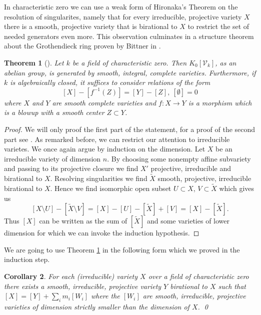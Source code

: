 \documentclass[11pt, a4paper, german]{article}
\theoremstyle{plain}
\newtheorem{theorem}{Theorem}[section]
\newtheorem{corollary}[theorem]{Corollary}
\theoremstyle{definition}
\newcommand{\gring}[1][k]{K_0[\mathcal{V}_#1]}
\begin{document}
In characteristic zero we can use a weak form of Hironaka's Theorem on the resolution of singularites, namely that for every irreducible, 
projective variety $X$ there is a smooth, projective variety that is birational to $X$ to restrict the set of needed generators even more. 
This observation culminates in a structure theorem about the Grothendieck ring proven by Bittner in \cite{Bittner}.


\begin{theorem}[{\cite[Thm. 3.1]{Bittner}}]
    \label{bittner}
    Let $k$ be a field of characteristic zero. Then $\gring[k]$, as an abelian group, is generated by smooth, integral, complete varieties.
    Furthermore, if $k$ is algebraically closed, it suffices to consider relations of the form
    \[
        [X] - [f^{-1}(Z)] = [Y] - [Z],\ [\emptyset] = 0
    \]
    where $X$ and $Y$ are smooth complete varieties and $f \colon X \to Y$ is a morphism which is a blowup with a smooth center $Z \subset Y$. 
\end{theorem}
\begin{proof}
    We will only proof the first part of the statement, for a proof of the second part see \cite{Bittner}. As remarked before, we can restrict our
    attention to irreducible varietes.  We once again argue by induction on the dimension.
    Let $X$ be an irreducible variety of dimension $n$. By choosing some nonempty affine subvariety and passing to its projective closure we
    find $X'$ projective, irreducible and birational to $X$. Resolving singularities we find $\widetilde{X}$ smooth, projective, irreducible
    birational to $X$. Hence we find isomorphic open subset $U \subset X$, $V \subset \widetilde{X}$ which gives us
    \[
        [X \setminus U ] - [\widetilde{X} \setminus V] = [X] - [U] - [\widetilde{X}] + [V] = [X] - [\widetilde{X}].
    \]
    Thus $[X]$ can be written as the sum of $[\widetilde{X}]$ and some varieties of lower dimension for which we can invoke the induction
    hypothesis.
\end{proof}

We are going to use Theorem \ref{bittner} in the following form which we proved in the induction step.

\begin{corollary}
    \label{decomp}
    For each (irreducible) variety $X$ over a field of characteristic zero there exists a smooth, irreducible, projective variety $Y$ birational
    to $X$ such that $[X] = [Y] + \sum_i m_i[W_i]$ where the $[W_i]$ are smooth, irreducible, projective varieties of dimension strictly
    smaller than the dimension of $X$. \qed
\end{corollary}
\end{document}
